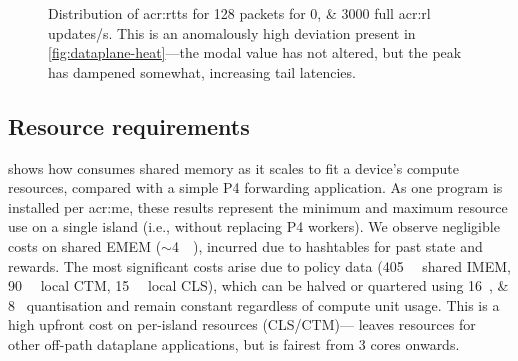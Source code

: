 \begin{figure}
	\centering
		\caption[Distribution of RTTs for \qty{128}{\byte} packets for \numlist{0;3000} full RL updates/s.]{Distribution of \glspl{acr:rtt} for \qty{128}{\byte} packets for \numlist{0;3000} full \gls{acr:rl} updates/s. This is an anomalously high deviation present in \cref{fig:dataplane-heat}---the modal value has not altered, but the peak has dampened somewhat, increasing tail latencies.\label{fig:dataplane-example}}
	
\end{figure}

\subsection{Resource requirements}
 shows how \approachshort{} consumes shared memory as it scales to fit a device's compute resources, compared with a simple P4 forwarding application.
As one program is installed per \gls{acr:me}, these results represent the minimum and maximum resource use on a single island (i.e., without replacing P4 workers).
We observe negligible costs on shared EMEM ($\sim$\qty{4}{\mebi\byte}), incurred due to hashtables for past state and rewards.
The most significant costs arise due to policy data (\qty{405}{\kibi\byte} shared IMEM, \qty{90}{\kibi\byte} local CTM, \qty{15}{\kibi\byte} local CLS), which can be halved or quartered using \qtylist{16;8}{\bit} quantisation and remain constant regardless of compute unit usage.
This is a high upfront cost on per-island resources (CLS/CTM)---\approachshort{} leaves resources for other off-path dataplane applications, but is fairest from 3 cores onwards.

